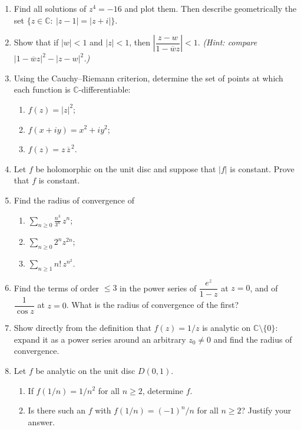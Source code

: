 \documentclass[12pt, reqno]{amsart}
\theoremstyle{definition}
\numberwithin{equation}{subsection}
\newcommand{\C}{\mathbb{C}}
\newcommand{\ov}[1]{\overline{#1}}
\begin{document}
\begin{enumerate}[leftmargin=*]

\item Find all solutions of $z^4=-16$ and plot them. Then describe geometrically the set
      $\{z\in\C:\ |z-1|=|z+i|\}$.

\item Show that if $|w|<1$ and $|z|<1$, then $\left|\dfrac{z-w}{1-\ov wz}\right|<1$.
      \emph{(Hint: compare $|1-\ov wz|^2-|z-w|^2$.)}

\item Using the Cauchy--Riemann criterion, determine the set of points at which each function is $\C$-differentiable:
\begin{enumerate}
\item $f(z)=|z|^2$;
\item $f(x+iy)=x^2+iy^2$;
\item $f(z)=z\,\ov z^{\,2}$.
\end{enumerate}

\item Let $f$ be holomorphic on the unit disc and suppose that $|f|$ is constant. Prove that $f$ is constant.

\item Find the radius of convergence of
\begin{enumerate}
\item $\displaystyle\sum_{n\ge0}\frac{n^3}{3^n}\,z^n$;
\item $\displaystyle\sum_{n\ge0}2^n z^{2n}$;
\item $\displaystyle\sum_{n\ge1}n!\,z^{n^2}$.
\end{enumerate}

\item Find the terms of order $\le3$ in the power series of $\dfrac{e^z}{1-z}$ at $z=0$, and of
      $\dfrac{1}{\cos z}$ at $z=0$. What is the radius of convergence of the first?

\item Show directly from the definition that $f(z)=1/z$ is analytic on $\C\setminus\{0\}$:
      expand it as a power series around an arbitrary $z_0\ne0$ and find the radius of convergence.

\item Let $f$ be analytic on the unit disc $D(0,1)$.
\begin{enumerate}
\item If $f(1/n)=1/n^2$ for all $n\ge2$, determine $f$.
\item Is there such an $f$ with $f(1/n)=(-1)^n/n$ for all $n\ge2$? Justify your answer.
\end{enumerate}


\end{enumerate}
\end{document}
